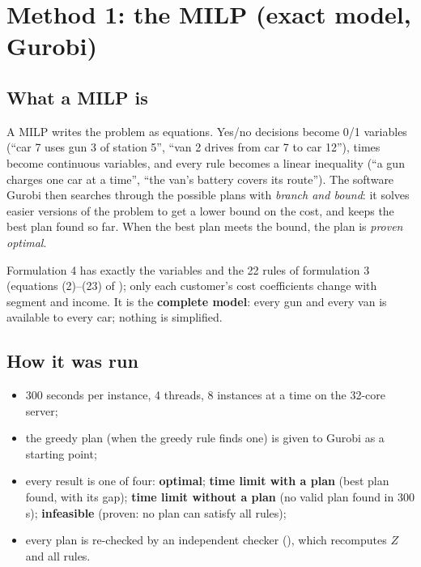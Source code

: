 \section{Method 1: the MILP (exact model, Gurobi)}

\subsection{What a MILP is}

A MILP writes the problem as equations. Yes/no decisions become 0/1 variables (``car 7 uses gun 3 of station 5'', ``van 2 drives from car 7 to car 12''), times become continuous variables, and every rule becomes a linear inequality (``a gun charges one car at a time'', ``the van's battery covers its route''). The software Gurobi then searches through the possible plans with \emph{branch and bound}: it solves easier versions of the problem to get a lower bound on the cost, and keeps the best plan found so far. When the best plan meets the bound, the plan is \emph{proven optimal}.

Formulation 4 has exactly the variables and the 22 rules of formulation 3 (equations (2)--(23) of ); only each customer's cost coefficients change with segment and income. It is the \textbf{complete model}: every gun and every van is available to every car; nothing is simplified.

\subsection{How it was run}
\begin{itemize}
  \item 300 seconds per instance, 4 threads, 8 instances at a time on the 32-core server;
  \item the greedy plan (when the greedy rule finds one) is given to Gurobi as a starting point;
  \item every result is one of four: \textbf{optimal}; \textbf{time limit with a plan} (best plan found, with its gap); \textbf{time limit without a plan} (no valid plan found in 300 s); \textbf{infeasible} (proven: no plan can satisfy all rules);
  \item every plan is re-checked by an independent checker (), which recomputes $Z$ and all rules.
\end{itemize}



